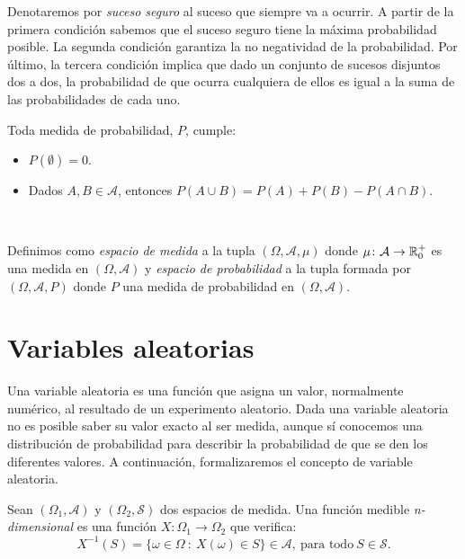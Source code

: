 \documentclass[oneside,openright,titlepage,numbers=noenddot,openany,headinclude,footinclude=true,
cleardoublepage=empty,abstractoff,BCOR=5mm,paper=a4,fontsize=12pt,main=spanish]{scrreprt}
\begin{document}
Denotaremos por \textit{suceso seguro} al suceso que siempre va a ocurrir. A partir de la primera condición sabemos que el suceso seguro tiene la máxima probabilidad posible. La segunda condición garantiza la no negatividad de la probabilidad. Por último, la tercera condición implica que dado un conjunto de sucesos disjuntos dos a dos, la probabilidad de que ocurra cualquiera de ellos es igual a la suma de las probabilidades de cada uno.\\

\begin{proposition} Toda medida de probabilidad, $P$, cumple:

\begin{itemize}
\item $P(\emptyset) = 0$.
\item Dados $A,B \in \mathcal{A}$, entonces $P(A \cup B) = P(A) + P(B) - P(A \cap B)$.
\end{itemize}
\end{proposition}\

\begin{definition}
Definimos como \textit{espacio de medida} a la tupla $(\Omega, \mathcal{A}, \mu)$ donde $\mu \colon \mathcal{A}\to \mathbb{R}_0^+$ es una medida en $(\Omega, \mathcal{A})$ y \textit{espacio de probabilidad} a la tupla formada por $(\Omega, \mathcal{A}, P)$ donde $P$ una medida de probabilidad en $(\Omega, \mathcal{A})$.
\end{definition}

\section{Variables aleatorias}

Una variable aleatoria es una función que asigna un valor, normalmente numérico, al resultado de un experimento aleatorio. Dada una variable aleatoria no es posible saber su valor exacto al ser medida, aunque sí conocemos una distribución de probabilidad para describir la probabilidad de que se den los diferentes valores. A continuación, formalizaremos el concepto de variable aleatoria.\\

\begin{definition}
Sean $(\Omega_1,\mathcal{A})$ y $(\Omega_2, \mathcal{S})$ dos espacios de medida. Una función medible \textit{n-dimensional} es una función $X\colon \Omega_1 \to \Omega_2$ que verifica: $$X^{-1}(S)=\{\omega \in \Omega \ : \ X(\omega)\in S\} \in \mathcal{A}, \ \text{para todo} \ S \in \mathcal{S}.$$
\end{definition}\
\end{document}
